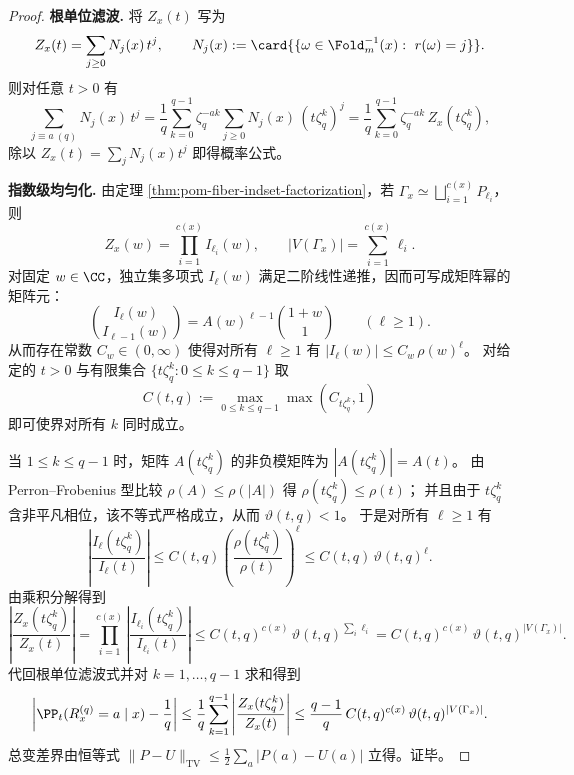 \begin{proof}
\textbf{根单位滤波.}
将 \(Z_x(t)\) 写为
\[
Z_x(t)=\sum_{j\ge 0}N_j(x)\,t^j,
\qquad
N_j(x):=\card{\{\omega\in\Fold_m^{-1}(x):\ r(\omega)=j\}}.
\]
则对任意 \(t>0\) 有
\[
\sum_{j\equiv a\ (q)}N_j(x)\,t^j
=\frac{1}{q}\sum_{k=0}^{q-1}\zeta_q^{-ak}\sum_{j\ge 0}N_j(x)\,(t\zeta_q^k)^{j}
=\frac{1}{q}\sum_{k=0}^{q-1}\zeta_q^{-ak}\,Z_x(t\zeta_q^k),
\]
除以 \(Z_x(t)=\sum_j N_j(x)t^j\) 即得概率公式。
\par
\textbf{指数级均匀化.}
由定理 \ref{thm:pom-fiber-indset-factorization}，若 \(\Gamma_x\simeq \bigsqcup_{i=1}^{c(x)} P_{\ell_i}\)，则
\[
Z_x(w)=\prod_{i=1}^{c(x)} I_{\ell_i}(w),
\qquad
|V(\Gamma_x)|=\sum_{i=1}^{c(x)} \ell_i.
\]
对固定 \(w\in\CC\)，独立集多项式 \(I_\ell(w)\) 满足二阶线性递推，因而可写成矩阵幂的矩阵元：
\[
\binom{I_\ell(w)}{I_{\ell-1}(w)}=A(w)^{\ell-1}\binom{1+w}{1}\qquad(\ell\ge 1).
\]
从而存在常数 \(C_w\in(0,\infty)\) 使得对所有 \(\ell\ge 1\) 有 \(|I_\ell(w)|\le C_w\,\rho(w)^\ell\)。
对给定的 \(t>0\) 与有限集合 \(\{t\zeta_q^k:0\le k\le q-1\}\) 取
\[
C(t,q):=\max_{0\le k\le q-1}\max(C_{t\zeta_q^k},1)
\]
即可使界对所有 \(k\) 同时成立。
\par
当 \(1\le k\le q-1\) 时，矩阵 \(A(t\zeta_q^k)\) 的非负模矩阵为 \(|A(t\zeta_q^k)|=A(t)\)。
由 Perron--Frobenius 型比较 \(\rho(A)\le \rho(|A|)\) 得 \(\rho(t\zeta_q^k)\le \rho(t)\)；
并且由于 \(t\zeta_q^k\) 含非平凡相位，该不等式严格成立，从而 \(\vartheta(t,q)<1\)。
于是对所有 \(\ell\ge 1\) 有
\[
\left|\frac{I_\ell(t\zeta_q^k)}{I_\ell(t)}\right|
\le
C(t,q)\left(\frac{\rho(t\zeta_q^k)}{\rho(t)}\right)^\ell
\le
C(t,q)\,\vartheta(t,q)^\ell.
\]
由乘积分解得到
\[
\left|\frac{Z_x(t\zeta_q^k)}{Z_x(t)}\right|
=\prod_{i=1}^{c(x)}\left|\frac{I_{\ell_i}(t\zeta_q^k)}{I_{\ell_i}(t)}\right|
\le C(t,q)^{c(x)}\,\vartheta(t,q)^{\sum_i\ell_i}
=C(t,q)^{c(x)}\,\vartheta(t,q)^{|V(\Gamma_x)|}.
\]
代回根单位滤波式并对 \(k=1,\dots,q-1\) 求和得到
\[
\left|\PP_t(R_x^{(q)}=a\mid x)-\frac{1}{q}\right|
\le \frac{1}{q}\sum_{k=1}^{q-1}\left|\frac{Z_x(t\zeta_q^k)}{Z_x(t)}\right|
\le \frac{q-1}{q}\,C(t,q)^{c(x)}\,\vartheta(t,q)^{|V(\Gamma_x)|}.
\]
总变差界由恒等式
\(
\|P-U\|_{\mathrm{TV}}\le \tfrac12\sum_a |P(a)-U(a)|
\)
立得。证毕。
\end{proof}

